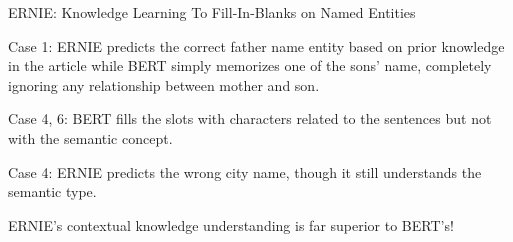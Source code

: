 \begin{frame}{ERNIE: Knowledge Learning To Fill-In-Blanks on Named Entities}
\begin{table}[htbp]
\begin{tableFont}
\begin{tabu}
        
        \hline 
    \end{tabu}
    
    \end{tableFont}
    
    \vspace{-5pt}
    
    
    \label{tbl:ernie_vs_bert_knowledgeLearningTask}
\end{table}
\vspace{-10pt}



\vspace{-10pt}
\begin{itemizeSpaced}{0pt}
    \linespread{0.1}
    \item Case 1: ERNIE predicts the correct father name entity based on prior knowledge in the article while BERT simply memorizes one of the sons' name, completely ignoring any relationship between mother and son. 
    
    \item Case 4, 6: BERT fills the slots with characters related to the sentences but not with the semantic concept. 
    
    \item Case 4: ERNIE predicts the wrong city name, though it still understands the semantic type.
\end{itemizeSpaced}

ERNIE's contextual knowledge understanding is far superior to BERT's!
    
\end{frame}